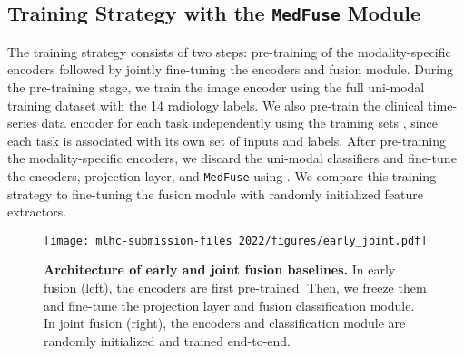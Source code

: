 \documentclass[pmlr]{jmlr}
\begin{document}
\subsection{Training Strategy with the \texttt{MedFuse} Module}
The training strategy consists of two steps: pre-training of the modality-specific encoders followed by jointly fine-tuning the encoders and fusion module. During the pre-training stage, we train the image encoder using the full uni-modal training dataset  with the 14 radiology labels. We also pre-train the clinical time-series data encoder for each task independently using the training sets , since each task is associated with its own set of inputs and labels. After pre-training the modality-specific encoders, we discard the uni-modal classifiers and fine-tune the encoders, projection layer, and \texttt{MedFuse} using . We compare this training strategy to fine-tuning the fusion module with randomly initialized feature extractors. 





\begin{figure}
    \centering
    \texttt{[image: mlhc-submission-files 2022/figures/early\_joint.pdf]}
    \caption{\small\textbf{Architecture of early and joint fusion baselines.} In early fusion (left), the encoders are first pre-trained. Then, we freeze them and fine-tune the projection layer and fusion classification module. In joint fusion (right), the encoders and classification module are randomly initialized and trained end-to-end.\vspace{-10mm}}
    \label{fig:baselines}
\end{figure}
\end{document}
